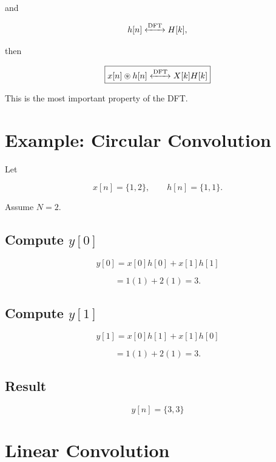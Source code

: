 and

\[
h[n]\xleftrightarrow{\text{DFT}}H[k],
\]

then

\[
\boxed{
x[n]\circledast h[n]
\xleftrightarrow{\text{DFT}}
X[k]H[k]
}
\]

This is the most important property of the DFT.


\section{Example: Circular Convolution}

Let

\[
x[n]=\{1,2\},
\qquad
h[n]=\{1,1\}.
\]

Assume \(N=2\).


\subsection{Compute \(y[0]\)}

\[
y[0]=x[0]h[0]+x[1]h[1]
\]

\[
=1(1)+2(1)=3.
\]


\subsection{Compute \(y[1]\)}

\[
y[1]=x[0]h[1]+x[1]h[0]
\]

\[
=1(1)+2(1)=3.
\]


\subsection{Result}

\[
\boxed{
y[n]=\{3,3\}
}
\]


\section{Linear Convolution}

